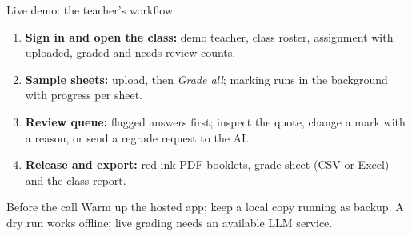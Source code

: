 \documentclass[14pt,aspectratio=169]{beamer}
\begin{document}
\begin{frame}{Live demo: the teacher's workflow}
\begin{enumerate}
  \item \textbf{Sign in and open the class:} demo teacher, class roster, assignment with uploaded, graded and needs-review counts.
  \item \textbf{Sample sheets:} upload, then \emph{Grade all}; marking runs in the background with progress per sheet.
  \item \textbf{Review queue:} flagged answers first; inspect the quote, change a mark with a reason, or send a regrade request to the AI.
  \item \textbf{Release and export:} red-ink PDF booklets, grade sheet (CSV or Excel) and the class report.
\end{enumerate}
\begin{block}{Before the call}
Warm up the hosted app; keep a local copy running as backup. A dry run works offline; live grading needs an available LLM service.
\end{block}
\end{frame}
\end{document}
